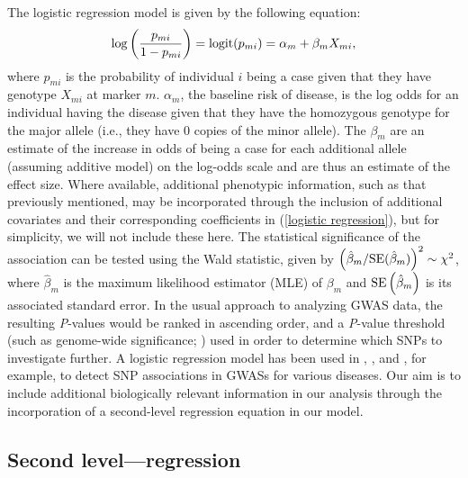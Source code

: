 The logistic regression model is given by the following
equation:
\begin{equation}
\log \left( \frac{p_{mi}}{1 - p_{mi}} \right)
= \hbox{logit} (p_{mi})
= \alpha_m + \beta_m X_{mi},
\label{logistic regression}
\end{equation}
where $p_{mi}$ is the probability of individual $i$ being a
case given that they have genotype $X_{mi}$ at marker $m$.
$\alpha_m$, the baseline risk of disease, is the log odds for
an individual having the disease given that they have the
homozygous genotype for the major allele (i.e., they have 0
copies of the minor allele). The $\beta_m$ are an estimate
of the increase in odds of being a case for each additional
allele (assuming additive model) on the log-odds scale and
are thus an estimate of the effect size. Where available,
additional phenotypic information, such as that previously
mentioned, may be incorporated through the inclusion of
additional covariates and their corresponding coefficients
in (\ref{logistic regression}), but for simplicity, we
will not include these here. The statistical significance
of the association can be tested using the Wald statistic,
given by
$\left( \hat{\beta}_m / \hbox{SE} (\hat{\beta}_m) \right)^2
\sim \chi^2$,
where $\hat{\beta}_m$ is the maximum likelihood estimator
(MLE) of $\beta_m$ and
$\hbox{SE} \left( \hat{\beta}_m \right)$
is its associated standard error. In the usual approach
to analyzing GWAS data, the resulting \textit{P}-values
would be ranked in ascending order, and a \textit{P}-value
threshold (such as genome-wide significance;
\citealp{Duditetal02})
used in order to determine which SNPs to investigate
further. A logistic regression model has been used in
\citet{rma2003},
\citet{LW2004},
and
\citet{rieger2004},
for example, to detect SNP associations in GWASs for
various diseases. Our aim is to include additional
biologically relevant information in our analysis through the
incorporation of a second-level regression equation in our model.


\subsection{Second level---regression}


